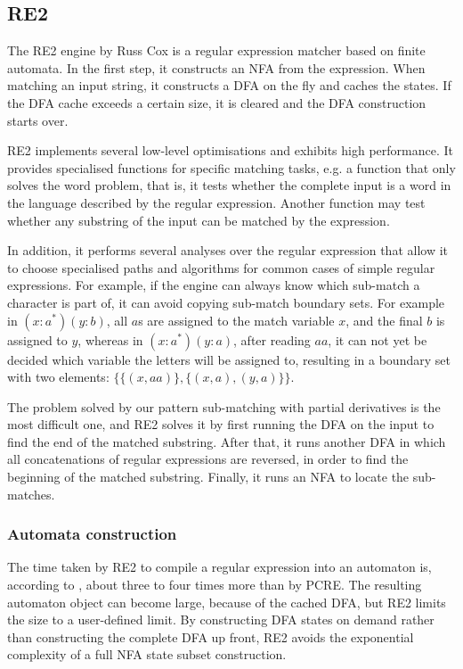 \subsection{RE2}

The RE2 engine by Russ Cox is a regular expression matcher based on finite
automata. In the first step, it constructs an NFA from the expression. When
matching an input string, it constructs a DFA on the fly and caches the states.
If the DFA cache exceeds a certain size, it is cleared and the DFA construction
starts over.

RE2 implements several low-level optimisations and exhibits high performance. It
provides specialised functions for specific matching tasks, e.g. a function that
only solves the word problem, that is, it tests whether the complete input is a
word in the language described by the regular expression. Another function may
test whether any substring of the input can be matched by the expression.

In addition, it performs several analyses over the regular expression that allow
it to choose specialised paths and algorithms for common cases of simple regular
expressions. For example, if the engine can always know which sub-match a
character is part of, it can avoid copying sub-match boundary sets. For example
in $(x:a^*)(y:b)$, all $a$s are assigned to the match variable $x$, and the
final $b$ is assigned to $y$, whereas in $(x:a^*)(y:a)$, after reading $aa$, it
can not yet be decided which variable the letters will be assigned to, resulting
in a boundary set with two elements: $\{\{(x,aa)\},\{(x,a),(y,a)\}\}$.

The problem solved by our pattern sub-matching with partial derivatives is the
most difficult one, and RE2 solves it by first running the DFA on the input to
find the end of the matched substring. After that, it runs another DFA in which
all concatenations of regular expressions are reversed, in order to find the
beginning of the matched substring. Finally, it runs an NFA to locate the
sub-matches.


\subsubsection{Automata construction}

The time taken by RE2 to compile a regular expression into an automaton is,
according to \cite{regexp3}, about three to four times more than by PCRE. The
resulting automaton object can become large, because of the cached DFA, but RE2
limits the size to a user-defined limit. By constructing DFA states on demand
rather than constructing the complete DFA up front, RE2 avoids the exponential
complexity of a full NFA state subset construction.


